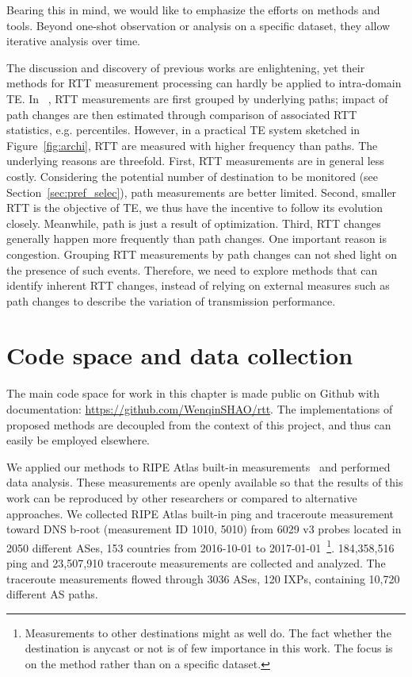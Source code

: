 Bearing this in mind, we would like to emphasize the efforts on methods and tools. 
Beyond one-shot observation or analysis on a specific dataset, they allow iterative analysis over time.

The discussion and discovery of previous works are enlightening, yet their methods for RTT measurement processing can hardly be applied to intra-domain TE.
In ~\cite{Pucha2007, Schwartz2010, Chandrasekaran},
RTT measurements are first grouped by underlying paths; 
impact of path changes are then estimated through comparison of associated RTT statistics, e.g. percentiles.
However, in a practical TE system sketched in Figure~\ref{fig:archi}, RTT are measured with higher frequency than paths.
The underlying reasons are threefold.
First, RTT measurements are in general less costly. 
Considering the potential number of destination to be monitored (see Section~\ref{sec:pref_selec}), path measurements are better limited.
Second, smaller RTT is the objective of TE, we thus have the incentive to follow its evolution closely. Meanwhile, path is just a result of optimization.
Third, RTT changes generally happen more frequently than path changes.
One important reason is congestion.
Grouping RTT measurements by path changes can not shed light on the presence of
such events.
Therefore, we need to explore methods that can identify inherent RTT changes, instead of relying on external measures such as path changes to describe the variation of transmission performance.

\section{Code space and data collection}
\label{sec:cpt_data}
The main code space for work in this chapter is made public on Github with documentation: \url{https://github.com/WenqinSHAO/rtt}.
The implementations of proposed methods are decoupled from the context of this project, and thus can easily be employed elsewhere.  

We applied our methods to RIPE Atlas built-in measurements~\cite{atlas} and performed data analysis.
These measurements are openly available so that the results of this work can be reproduced by other researchers or compared to alternative approaches.
We collected RIPE Atlas built-in ping and traceroute measurement toward DNS b-root (measurement ID 1010, 5010) from 6029 v3 probes located in 2050 different ASes, 153 countries from 2016-10-01 to 2017-01-01~\footnote{Measurements to other destinations might as well do. The fact whether the destination is anycast or not is of few importance in this work. The focus is on the method rather than on a specific dataset.}.
184,358,516 ping and 23,507,910 traceroute measurements are collected and analyzed.
The traceroute measurements flowed through 3036 ASes, 120 IXPs, containing 10,720 different AS paths.


